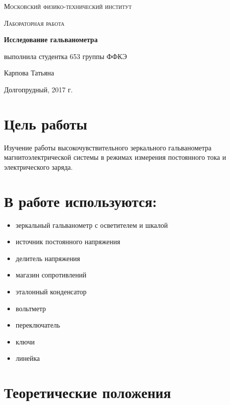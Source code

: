\documentclass[a4paper]{article}
\begin{document}
\begin{titlepage}
	\centering
	\vspace{5cm}
	{\scshape\LARGE Московский физико-технический институт \par}
	\vspace{4cm}
	{\scshape\Large Лабораторная работа \par}
	\vspace{1cm}
	{\huge\bfseries Исследование гальванометра \par}
	\vspace{1cm}
	\vfill
\begin{flushright}
	{\large выполнила студентка 653 группы ФФКЭ}\par
	\vspace{0.3cm}
	{\LARGE Карпова Татьяна}
\end{flushright}
	

	\vfill

	Долгопрудный, 2017 г.
\end{titlepage}

\section{Цель работы}
Изучение работы высокочувствительного зеркального гальванометра магнитоэлектрической системы в режимах измерения постоянного тока и электрического заряда.

\section{В работе используются:}
\begin{itemize}
    \item зеркальный гальванометр с осветителем и шкалой
    \item источник постоянного напряжения
    \item делитель напряжения
    \item магазин сопротивлений
    \item эталонный конденсатор
    \item вольтметр
    \item переключатель
    \item ключи
    \item линейка
\end{itemize}

\section{Теоретические положения}
\end{document}
